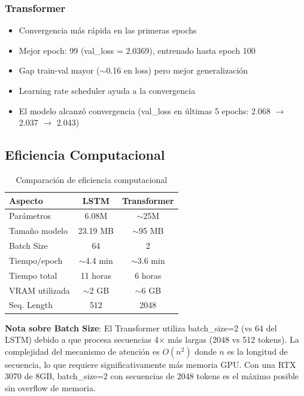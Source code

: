 \documentclass[12pt,a4paper]{article}
\begin{document}
\subsubsection{Transformer}
\begin{itemize}
    \item Convergencia más rápida en las primeras epochs
    \item Mejor epoch: 99 (val\_loss = 2.0369), entrenado hasta epoch 100
    \item Gap train-val mayor ($\sim$0.16 en loss) pero mejor generalización
    \item Learning rate scheduler ayuda a la convergencia
    \item El modelo alcanzó convergencia (val\_loss en últimas 5 epochs: 2.068 $\rightarrow$ 2.037 $\rightarrow$ 2.043)
\end{itemize}

\subsection{Eficiencia Computacional}

\begin{table}[H]
\centering
\begin{tabular}{lcc}
\toprule
\textbf{Aspecto} & \textbf{LSTM} & \textbf{Transformer} \\
\midrule
Parámetros & 6.08M & $\sim$25M \\
Tamaño modelo & 23.19 MB & $\sim$95 MB \\
Batch Size & 64 & 2 \\
Tiempo/epoch & $\sim$4.4 min & $\sim$3.6 min \\
Tiempo total & 11 horas & 6 horas \\
VRAM utilizada & $\sim$2 GB & $\sim$6 GB \\
Seq. Length & 512 & 2048 \\
\bottomrule
\end{tabular}
\caption{Comparación de eficiencia computacional}
\end{table}

\textbf{Nota sobre Batch Size}: El Transformer utiliza batch\_size=2 (vs 64 del LSTM) debido a que procesa secuencias 4$\times$ más largas (2048 vs 512 tokens). La complejidad del mecanismo de atención es $O(n^2)$ donde $n$ es la longitud de secuencia, lo que requiere significativamente más memoria GPU. Con una RTX 3070 de 8GB, batch\_size=2 con secuencias de 2048 tokens es el máximo posible sin overflow de memoria.
\end{document}
